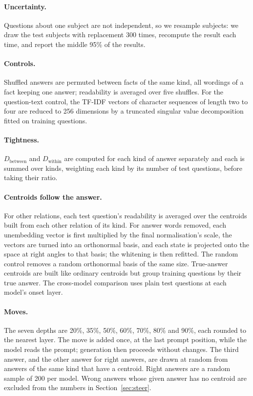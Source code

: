 \paragraph{Uncertainty.} Questions about one subject are not independent, so we resample subjects: we draw the test subjects with replacement 300 times, recompute the result each time, and report the middle 95\% of the results.

\paragraph{Controls.} Shuffled answers are permuted between facts of the same kind, all wordings of a fact keeping one answer; readability is averaged over five shuffles. For the question-text control, the TF-IDF vectors of character sequences of length two to four are reduced to 256 dimensions by a truncated singular value decomposition fitted on training questions.

\paragraph{Tightness.} $D_{\text{between}}$ and $D_{\text{within}}$ are computed for each kind of answer separately and each is summed over kinds, weighting each kind by its number of test questions, before taking their ratio.

\paragraph{Centroids follow the answer.} For other relations, each test question's readability is averaged over the centroids built from each other relation of its kind. For answer words removed, each unembedding vector is first multiplied by the final normalisation's scale, the vectors are turned into an orthonormal basis, and each state is projected onto the space at right angles to that basis; the whitening is then refitted. The random control removes a random orthonormal basis of the same size. True-answer centroids are built like ordinary centroids but group training questions by their true answer. The cross-model comparison uses plain test questions at each model's onset layer.

\paragraph{Moves.} The seven depths are 20\%, 35\%, 50\%, 60\%, 70\%, 80\% and 90\%, each rounded to the nearest layer. The move is added once, at the last prompt position, while the model reads the prompt; generation then proceeds without changes. The third answer, and the other answer for right answers, are drawn at random from answers of the same kind that have a centroid. Right answers are a random sample of 200 per model. Wrong answers whose given answer has no centroid are excluded from the numbers in Section~\ref{sec:steer}.

